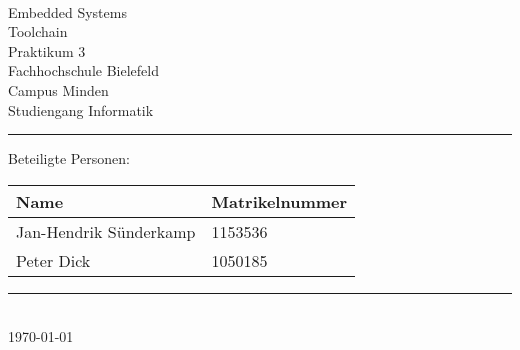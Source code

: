 \begin{titlepage}
   \mbox{}\vspace{5\baselineskip}\\
   \sffamily\huge
   \centering
   {\Huge Embedded Systems} \\
   Toolchain\\
    \normalsize Praktikum  3
   \vspace{3\baselineskip}\\
   \rmfamily\Large
  Fachhochschule Bielefeld \\
  Campus Minden \\
  Studiengang Informatik
   \vspace{2\baselineskip}\\
\noindent\rule{15cm}{0.4pt}
Beteiligte Personen:
\begin{table}[H]
	\tablestyle
	\begin{tabular}{*{2}{v{0.45\textwidth}}}
		\hline
		\textbf{Name} & \textbf{Matrikelnummer}
		\tabularnewline
		\hline
		Jan-Hendrik Sünderkamp & 1153536\tabularnewline
		Peter Dick & 1050185\tabularnewline
	\end{tabular}
\end{table}

   \noindent\rule{15cm}{0.4pt}
      \vspace{1\baselineskip}\\
   \today
\end{titlepage}

